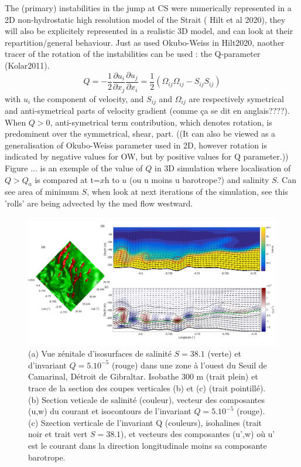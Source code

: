 The (primary) instabilities in the jump at CS were numerically represented in a 2D non-hydrostatic high resolution model of the Strait ( Hilt et al 2020), they will also be explicitely represented in a realistic 3D model, and can look at their repartition/general behaviour. Just as used Okubo-Weiss in Hilt2020, naother tracer of the rotation of the instabilities can be used : the Q-parameter (Kolar2011).
\begin{equation}
Q=-\frac{1}{2} \frac{\partial u_i}{\partial x_j} \frac{\partial u_j}{\partial x_i} = \frac{1}{2} (\Omega_{ij}\Omega_{ij} - S_{ij} S_{ij})
\end{equation}
with $u_i$ the component of velocity, and $S_{ij}$ and $\Omega_{ij}$ are respectively symetrical and anti-symetrical parts of velocity gradient (comme ça se dit en anglais????). When $Q>0$, anti-symetrical term contribution, which denotes rotation, is predominent over the symmetrical, shear, part. ((It can also be viewed as a generalisation of Okubo-Weiss parameter used in 2D, however rotation is indicated by negative values for OW, but by positive values for Q parameter.))
Figure ... is an exemple of the value of $Q$ in 3D simulation where localisation of $Q>Q_a$ is compared at t=$x$h to $u$ (ou u moins u barotrope?) and salinity $S$. Can see area of minimum $S$, when look at next iterations of the simulation, see this 'rolls' are being advected by the med flow westward. 


\begin{figure}[!h]
 \centering
 \includegraphics[width=1\textwidth]{./GBR3D/FigInstaQ_IES4H.png}
 \caption {(a) Vue zénitale d'isosurfaces de salinité $S=38.1$ (verte) et d'invariant $Q=5.10^{-5}$ (rouge) dans une zone à l'ouest du Seuil de Camarinal, Détroit de Gibraltar. Isobathe 300 m (trait plein) et trace de la section des coupes verticales (b) et (c) (trait pointillé). (b) Section veticale de salinité (couleur), vecteur des composantes (u,w) du courant et isocontours de l'invariant $Q=5.10^{-5}$ (rouge). (c) Szection verticale de l'invariant Q (couleurs), isohalines (trait noir et trait vert $S=38.1$), et vecteurs des composantes (u',w) où u' est le courant dans la direction longitudinale moins sa composante barotrope.}
 \label{figdraftQ}
\end{figure}


